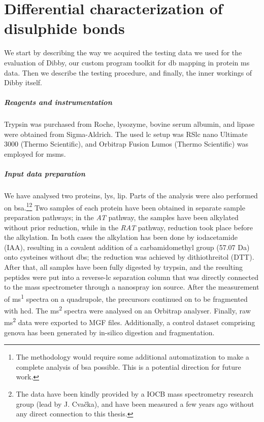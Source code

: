 
\chapter{Differential characterization of disulphide bonds}

We start by describing the way we acquired the testing data we used for the evaluation of Dibby, our custom program toolkit for \gls*{db} mapping in protein \gls*{ms} data. Then we describe the testing procedure, and finally, the inner workings of Dibby itself.

\paragraph{Reagents and instrumentation} Trypsin was purchased from Roche, lyso\-zyme, bovine serum albumin, and lipase were obtained from Sigma-Aldrich. The used \gls*{lc} setup was RS\gls*{lc} nano Ultimate 3000 (Thermo Scientific), and Orbitrap Fusion Lumos (Thermo Scientific) was employed for \gls*{msms}.

\paragraph{Input data preparation} We have analysed two proteins, \gls*{lys}, \gls*{lip}. Parts of the analysis were also performed on \gls*{bsa}.\footnote{The methodology would require some additional automatization to make a complete analysis of \gls*{bsa} possible. This is a potential direction for future work.}\footnote{The data have been kindly provided by a IOCB mass spectrometry research group (lead by J. Cvačka), and have been measured a few years ago without any direct connection to this thesis.} Two samples of each protein have been obtained in separate sample preparation pathways; in the \emph{AT} pathway, the samples have been alkylated without prior reduction, while in the \emph{RAT} pathway, reduction took place before the alkylation. In both cases the alkylation has been done by iodacetamide (IAA), resulting in a covalent addition of a carbamidomethyl group (57.07 Da) onto cysteines without \glspl*{db}; the reduction was achieved by dithiothreitol (DTT). After that, all samples have been fully digested by trypsin, and the resulting peptides were put into a reverse-\gls*{lc} separation column that was directly connected to the mass spectrometer through a nanospray ion source. After the measurement of \gls*{ms}\textsuperscript{1} spectra on a quadrupole, the precursors continued on to be fragmented with \gls*{hcd}\@. The \gls*{ms}\textsuperscript{2} spectra were analysed on an Orbitrap analyser. Finally, raw \gls*{ms}\textsuperscript{2} data were exported to MGF files. Additionally, a control dataset comprising \gls*{genova} has been generated by in-silico digestion and fragmentation.

